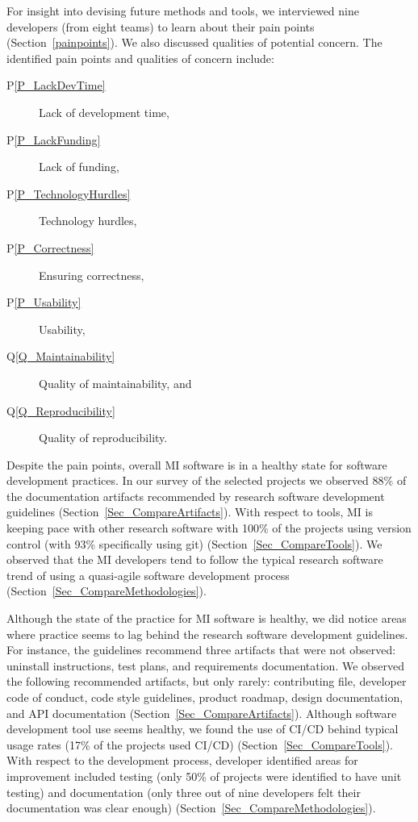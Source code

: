 \documentclass[11pt]{article}
\newcommand{\ppref}[1]{P\ref{#1}}
\newcommand{\qref}[1]{Q\ref{#1}}
\begin{document}
For insight into devising future methods and tools, we interviewed nine
developers (from eight teams) to learn about their pain points
(Section~\ref{painpoints}).  We also discussed qualities of potential concern.
The identified pain points and qualities of concern include: 

\begin{description}
\item [\ppref{P_LackDevTime}] Lack of development time, %
\item [\ppref{P_LackFunding}] Lack of funding, %
\item [\ppref{P_TechnologyHurdles}] Technology hurdles, %
\item [\ppref{P_Correctness}] Ensuring correctness, %
\item [\ppref{P_Usability}] Usability, %
\item [\qref{Q_Maintainability}] Quality of maintainability, and %
\item [\qref{Q_Reproducibility}] Quality of reproducibility. %
\end{description}  

Despite the pain points, overall MI software is in a healthy state for software
development practices.  In our survey of the selected projects we observed 88\%
of the documentation artifacts recommended by research software development
guidelines (Section~\ref{Sec_CompareArtifacts}).  With respect to tools, MI is
keeping pace with other research software with 100\% of the projects using
version control (with 93\% specifically using git)
(Section~\ref{Sec_CompareTools}).  We observed that the MI developers tend to
follow the typical research software trend of using a quasi-agile software
development process (Section~\ref{Sec_CompareMethodologies}).

Although the state of the practice for MI software is healthy, we did notice
areas where practice seems to lag behind the research software development
guidelines.  For instance, the guidelines recommend three artifacts that were
not observed: uninstall instructions, test plans, and requirements
documentation. We observed the following recommended artifacts, but only rarely:
contributing file, developer code of conduct, code style guidelines, product
roadmap, design documentation, and API documentation
(Section~\ref{Sec_CompareArtifacts}). Although software development tool use
seems healthy, we found the use of CI/CD behind typical usage rates (17\% of the
projects used CI/CD) (Section~\ref{Sec_CompareTools}).  With respect to the
development process, developer identified areas for improvement included testing
(only 50\% of projects were identified to have unit testing) and documentation
(only three out of nine developers felt their documentation was clear enough)
(Section~\ref{Sec_CompareMethodologies}).
\end{document}
